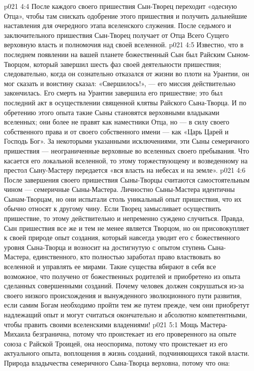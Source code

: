 \vs p021 4:4 После каждого своего пришествия Сын\hyp{}Творец переходит «одесную Отца», чтобы там снискать одобрение этого пришествия и получить дальнейшие наставления для очередного этапа вселенского служения. После седьмого и заключительного пришествия Сын\hyp{}Творец получает от Отца Всего Сущего верховную власть и полномочия над своей вселенной.
\vs p021 4:5 \pc Известно, что в последнем появлении на вашей планете божественный Сын был Райским Сыном\hyp{}Творцом, который завершил шесть фаз своей деятельности пришествия; следовательно, когда он сознательно отказался от жизни во плоти на Урантии, он мог сказать и воистину сказал: «Свершилось!», --- его миссия действительно закончилась. Его смерть на Урантии завершила его пришествие; это был последний акт в осуществлении священной клятвы Райского Сына\hyp{}Творца. И по обретению этого опыта такие Сыны становятся верховными владыками вселенных; они более не правят как наместники Отца, но --- в силу своего собственного права и от своего собственного имени --- как «Царь Царей и Господь Бог». За некоторыми указанными исключениями, эти Сыны семеричного пришествия --- неограниченные верховные во вселенных своего пребывания. Что касается его локальной вселенной, то этому торжествующему и возведенному на престол Сыну\hyp{}Мастеру передается «вся власть на небесах и на земле».
\vs p021 4:6 \pc После завершения своего пришествия Сыны\hyp{}Творцы считаются самостоятельным чином --- семеричные Сыны\hyp{}Мастера. Личностно Сыны\hyp{}Мастера идентичны Сынам\hyp{}Творцам, но они испытали столь уникальный опыт пришествия, что их обычно относят к другому чину. Если Творец замысливает осуществить пришествие, то этому действительно и непременно суждено случиться. Правда, Сын пришествия все же и тем не менее является Творцом, но он присовокупляет к своей природе опыт создания, который навсегда уводит его с божественного уровня Сына\hyp{}Творца и возносит на достигнутую с опытом ступень Сына\hyp{}Мастера, единственного, кто полностью заработал право властвовать во вселенной и управлять ее мирами. Такие существа вбирают в себя все возможное, что получено от божественных родителей и приобретено из опыта сделанных совершенными созданий. Почему человек должен сокрушаться из\hyp{}за своего низкого происхождения и вынужденного эволюционного пути развития, если самим Богам необходимо пройти тем же путем прежде, чем они приобретут надлежащий опыт и могут считаться окончательно и абсолютно компетентными, чтобы править своими вселенскими владениями!
\vs p021 5:1 Мощь Мастера\hyp{}Михаила безгранична, потому что проистекает из его проверенного на опыте союза с Райской Троицей, она неоспорима, потому что проистекает из его актуального опыта, воплощения в жизнь созданий, подчиняющихся такой власти. Природа владычества семеричного Сына\hyp{}Творца верховна, потому что она:
